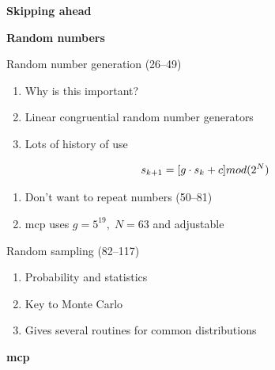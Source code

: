 \documentclass[aspectratio=1610,pdftex,dvipsnames,compress,xcolor={dvipsnames}]{beamer}
\newcommand{\acs}{\acrshort} %
\begin{document}
\begin{frame}[plain]{}
    \centering\LARGE\textbf{Skipping ahead}
\end{frame}


\begin{frame}[plain]{}
    \centering\LARGE\textbf{Random numbers}
\end{frame}


\addtocounter{framenumber}{-2} 
\begin{frame}{Random number generation (26--49)}
    \begin{enumerate}[series=outerlist,topsep=0pt,itemsep=21pt,leftmargin=*,label=(\arabic*)]
        \item[]Why is this important?
        \item[]Linear congruential random number generators
        \item[]Lots of history of use
    \end{enumerate}

    \vspace*{\fill}

    \begin{equation}
        \LARGE
        s_{k+1} = [g \cdot s_k + c] mod(2^N)
    \end{equation}

    \vspace*{\fill}

    \begin{enumerate}[series=outerlist,topsep=0pt,itemsep=21pt,leftmargin=*,label=(\arabic*)]
        \item[]Don't want to repeat numbers (50--81)
        \item[]\acs{mcp} uses $g = 5^{19}, \; N = 63$ and adjustable
    \end{enumerate}
\end{frame}


\begin{frame}{Random sampling (82--117)}
    \begin{enumerate}[series=outerlist,topsep=0pt,itemsep=21pt,leftmargin=*,label=(\arabic*)]
        \item[]Probability and statistics
        \item[]Key to Monte Carlo
        \item[]Gives several routines for common distributions
    \end{enumerate}
\end{frame}


\begin{frame}[plain]{}
    \centering\LARGE\textbf{\acs{mcp}}
\end{frame}
\end{document}

